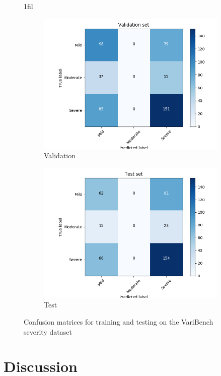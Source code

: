 \documentclass[11pt]{article}
\makeatletter
\newcommand*{\centerfloat}{%
  \parindent \z@
  \leftskip \z@ \@plus 1fil \@minus \textwidth
  \rightskip\leftskip
  \parfillskip \z@skip}
\makeatother
\begin{document}
\begin{figure}
\centerfloat
\begin{subfigure}{.8\textwidth}
  \centering
  \includegraphics[width=.9\linewidth]{confmat_val_build.png}
  \caption{Validation}
  \label{fig:sub1}
\end{subfigure}%
\begin{subfigure}{.8\textwidth}
  \centering
  \includegraphics[width=.9\linewidth]{confmat_test_build.png}
  \caption{Test}
  \label{fig:sub2}
\end{subfigure}
\caption{Confusion matrices for training and testing on the VariBench severity dataset}
\label{fig:confmat_severity}
\end{figure}
    
    
\clearpage
\section{Discussion}
\end{document}
